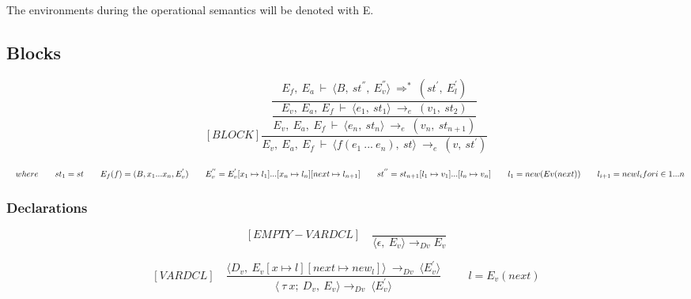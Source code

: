 	
	The environments during the operational semantics will be denoted with E.
	
	
	
	
	
	\subsection{Blocks}
	
	
	\[	
	[BLOCK]	
	\dfrac{\dfrac{E_f, \ E_a \ \vdash \ \langle B, \ st^{''}, \ E_v^{''} \rangle \ \Rightarrow^* \ (st^{'}, \ E_l^{'})}{\dfrac{E_v, \ E_a, \ E_f \ \vdash \ \langle e_1, \ st_1 \rangle \ \rightarrow_e \ (v_1, \ st_2)}{E_v, \ E_a, \ E_f \ \vdash \ \langle e_n, \ st_n \rangle \ \rightarrow_e \ (v_n, \ st_{n+1})}}}{E_v, \ E_a, \ E_f \ \vdash \ \langle f(e_1 \ ... \ e_n), \ st \rangle \ \rightarrow_e \ (v, \ st^{'})}	
	\]
	
	
	
	
	
	\begin{math}		
		\quad where \newline		
		\qquad st_1 = st \newline		
		\qquad E_f(f) = (B, x_1 ... x_n, E_v^{'}) \newline		
		\qquad E_v^{''} = E_v^{'}[x_1 \mapsto l_1] ... [x_n \mapsto l_n] [next \mapsto l_{n+1}] \newline		
		\qquad st^{''} = st_{n+1}[l_1 \mapsto v_1] ... [l_n \mapsto v_n] \newline		
		\qquad l_1 = new (Ev(next)) \newline		
		\qquad l_{i+1}= new l_i for i \in {1 ... n}		
	\end{math}
	
	
	
	
	
	\subsubsection{Declarations}
	
	
	\[	
	[EMPTY-VARDCL] \quad	
	\dfrac{}{\langle\epsilon, \ E_v\rangle \rightarrow_{Dv} E_v}	
	\]
	
	
	
	
	
	\[	
	[VARDCL] \quad	
	\dfrac{ \langle D_v, \ E_v[x \mapsto l][next \mapsto new_l]\rangle \ \rightarrow_{Dv} \ \langle E_v^{'} \rangle }{ \langle \ \tau \ x; \ D_v,\ E_v \rangle \rightarrow_{Dv} \ \langle E_v^{'} \rangle }	
	\qquad \ \ l = E_v(next)	
	\]
	
